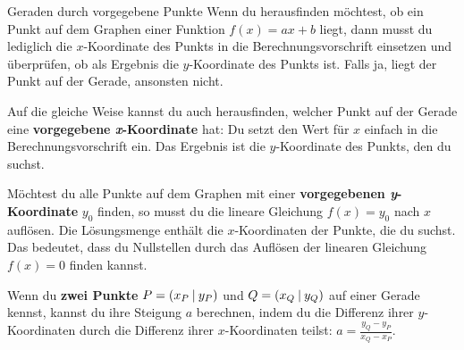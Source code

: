\documentclass[../../main.tex]{subfiles}
\begin{document}
\newpage
\begin{nutshell}{Geraden durch vorgegebene Punkte}
    Wenn du herausfinden möchtest, ob ein Punkt auf dem Graphen einer Funktion $f(x)=ax+b$ liegt, dann musst du lediglich die $x$-Koordinate des Punkts in die Berechnungsvorschrift einsetzen und überprüfen, ob als Ergebnis die $y$-Koordinate des Punkts ist. Falls ja, liegt der Punkt auf der Gerade, ansonsten nicht.
    
    Auf die gleiche Weise kannst du auch herausfinden, welcher Punkt auf der Gerade eine \textbf{vorgegebene \emph{x}-Koordinate} hat: Du setzt den Wert für $x$ einfach in die Berechnungsvorschrift ein. Das Ergebnis ist die $y$-Koordinate des Punkts, den du suchst.

    Möchtest du alle Punkte auf dem Graphen mit einer \textbf{vorgegebenen \emph{y}-Koordinate} $y_0$ finden, so musst du die lineare Gleichung $f(x)=y_0$ nach $x$ auflösen. Die Lösungsmenge enthält die $x$-Koordinaten der Punkte, die du suchst. Das bedeutet, dass du Nullstellen durch das Auflösen der linearen Gleichung $f(x)=0$ finden kannst.


    Wenn du \textbf{zwei Punkte} \mbox{$P=\left(x_P \:\middle|\: y_P\right)$} und \mbox{$Q=\left(x_Q \:\middle|\: y_Q\right)$} auf einer Gerade kennst, kannst du ihre Steigung $a$ berechnen, indem du die Differenz ihrer $y$-Koordinaten durch die Differenz ihrer $x$-Koordinaten teilst: $a=\frac{y_Q-y_P}{x_Q-x_P}$.


\end{nutshell}
\end{document}

